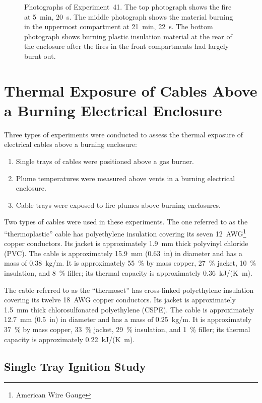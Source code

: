 \begin{figure}[p]
\caption[Photographs of Experiment~41]{Photographs of Experiment~41. The top photograph shows the fire at 5~min, 20~s. The middle photograph shows the material burning in the uppermost compartment at 21~min, 22~s. The bottom photograph shows burning plastic insulation material at the rear of the enclosure after the fires in the front compartments had largely burnt out. }
\label{fig:Test_41_photos}
\end{figure}






\clearpage

\section{Thermal Exposure of Cables Above a Burning Electrical Enclosure}
\label{Sec:Cables}
Three types of experiments were conducted to assess the thermal exposure of electrical cables above a burning enclosure:
\begin{enumerate}
\item Single trays of cables were positioned above a gas burner.
\item Plume temperatures were measured above vents in a burning electrical enclosure.
\item Cable trays were exposed to fire plumes above burning enclosures.
\end{enumerate}
Two types of cables were used in these experiments. The one referred to as the ``thermoplastic'' cable has polyethylene insulation covering its seven 12~AWG\footnote{American Wire Gauge} copper conductors. Its jacket is approximately 1.9~mm thick polyvinyl chloride (PVC). The cable is approximately 15.9~mm (0.63~in) in diameter and has a mass of 0.38~kg/m. It is approximately 55~\% by mass copper, 27~\% jacket, 10~\% insulation, and 8~\% filler; its thermal capacity is approximately 0.36~kJ/(K~m).

The cable referred to as the ``thermoset'' has cross-linked polyethylene insulation covering its twelve 18~AWG copper conductors. Its jacket is approximately 1.5~mm thick chlorosulfonated polyethylene (CSPE). The cable is approximately 12.7~mm (0.5~in) in diameter and has a mass of 0.25~kg/m. It is approximately 37~\% by mass copper, 33~\% jacket, 29~\% insulation, and 1~\% filler; its thermal capacity is approximately 0.22~kJ/(K~m).

\subsection{Single Tray Ignition Study}

